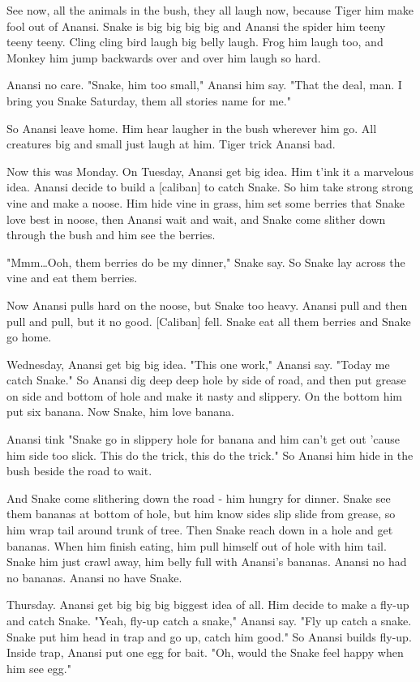See now, all the animals in the bush, they all laugh now, because Tiger him make fool out of Anansi. Snake is big big big big and Anansi the spider him teeny teeny teeny. Cling cling bird laugh big belly laugh. Frog him laugh too, and Monkey him jump backwards over and over him laugh so hard.

Anansi no care. "Snake, him too small," Anansi him say. "That the deal, man. I bring you Snake Saturday, them all stories name for me."

So Anansi leave home. Him hear laugher in the bush wherever him go. All creatures big and small just laugh at him. Tiger trick Anansi bad.

Now this was Monday. On Tuesday, Anansi get big idea. Him t'ink it a marvelous idea. Anansi decide to build a [caliban] to catch Snake. So him take strong strong vine and make a noose. Him hide vine in grass, him set some berries that Snake love best in noose, then Anansi wait and wait, and Snake come slither down through the bush and him see the berries.

"Mmm\dots Ooh, them berries do be my dinner," Snake say. So Snake lay across the vine and eat them berries.

Now Anansi pulls hard on the noose, but Snake too heavy. Anansi pull and then pull and pull, but it no good. [Caliban] fell. Snake eat all them berries and Snake go home.

Wednesday, Anansi get big big idea. "This one work," Anansi say. "Today me catch Snake." So Anansi dig deep deep hole by side of road, and then put grease on side and bottom of hole and make it nasty and slippery. On the bottom him put six banana. Now Snake, him love banana.

Anansi tink "Snake go in slippery hole for banana and him can't get out 'cause him side too slick. This do the trick, this do the trick." So Anansi him hide in the bush beside the road to wait.

And Snake come slithering down the road - him hungry for dinner. Snake see them bananas at bottom of hole, but him know sides slip slide from grease, so him wrap tail around trunk of tree. Then Snake reach down in a hole and get bananas. When him finish eating, him pull himself out of hole with him tail. Snake him just crawl away, him belly full with Anansi's bananas. Anansi no had no bananas. Anansi no have Snake.

Thursday. Anansi get big big big biggest idea of all. Him decide to make a fly-up and catch Snake. "Yeah, fly-up catch a snake," Anansi say. "Fly up catch a snake. Snake put him head in trap and go up, catch him good." So Anansi builds fly-up. Inside trap, Anansi put one egg for bait. "Oh, would the Snake feel happy when him see egg."

